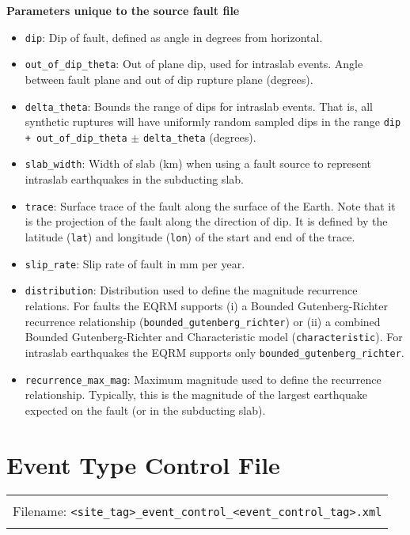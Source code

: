 \textbf{Parameters unique to the source fault file}
\begin{itemize}
\item \texttt{dip}: Dip of fault, defined as angle in degrees from
  horizontal.

\item \texttt{out\_of\_dip\_theta}: Out of plane dip, used for
  intraslab events. Angle between fault plane and out of dip rupture
  plane (degrees).

\item \texttt{delta\_theta}: Bounds the range of dips for intraslab
  events. That is, all synthetic ruptures will have uniformly random
  sampled dips in the range \texttt{dip + out\_of\_dip\_theta} $\pm$
  \texttt{delta\_theta} (degrees).

\item \texttt{slab\_width}: Width of slab (km) when using a fault
  source to represent intraslab earthquakes in the subducting slab.

\item \texttt{trace}: Surface trace of the fault along the surface
of the Earth. Note that it is the projection of the fault along the
direction of dip. It is defined by the latitude (\texttt{lat}) and
longitude (\texttt{lon}) of the start and end of the trace.
\item \texttt{slip\_rate}: Slip rate of fault in mm per year.

\item \texttt{distribution}: Distribution used to define the magnitude
  recurrence relations.  For faults the EQRM supports (i) a Bounded
  Gutenberg-Richter recurrence relationship
  (\texttt{bounded}\texttt{\_gutenberg}\texttt{\_richter}) or (ii) a
  combined Bounded Gutenberg-Richter and Characteristic model
  (\texttt{characteristic}). For intraslab earthquakes the EQRM
  supports only
  \texttt{bounded}\texttt{\_gutenberg}\texttt{\_richter}.

\item \texttt{recurrence\_max\_mag}: Maximum magnitude used to
define the recurrence relationship. Typically, this is the magnitude
of the largest earthquake expected on the fault (or in the
subducting slab).
\end{itemize}

\section{Event Type Control File}
\label{sec:event-type-control_file}
\begin{center}
\begin{tabular}{|c|}
\hline
\\
Filename: \texttt{<site\_tag>\_}\texttt{event\_control\_}\texttt{<event\_control\_tag>}\texttt{.xml}\\
\\
\hline
\end{tabular}
\end{center}

